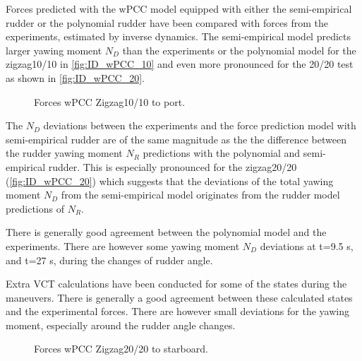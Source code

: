 Forces predicted with the wPCC model equipped with either the semi-empirical rudder or the polynomial rudder have been compared with forces from the experiments, estimated by inverse dynamics. The semi-empirical model predicts larger yawing moment $N_D$ than the experiments or the polynomial model for the zigzag10/10 in \autoref{fig:ID_wPCC_10} and even more pronounced for the 20/20 test as shown in \autoref{fig:ID_wPCC_20}.  
\begin{figure}[h]
     \centering
     
     \caption{Forces wPCC Zigzag10/10 to port.}
     \label{fig:ID_wPCC_10}
\end{figure}
The $N_D$ deviations between the experiments and the force prediction model with semi-empirical rudder are of the same magnitude as the the difference between the rudder yawing moment $N_R$ predictions with the polynomial and semi-empirical rudder. This is especially pronounced for the zigzag20/20 (\autoref{fig:ID_wPCC_20}) which suggests that the deviations of the total yawing moment $N_D$ from the semi-empirical model originates from the rudder model predictions of $N_R$.

There is generally good agreement between the polynomial model and the experiments. There are however some yawing moment $N_D$ deviations at t=9.5 s, and t=27 s, during the changes of rudder angle. 

Extra VCT calculations have been conducted for some of the states during the maneuvers. There is generally a good agreement between these calculated states and the experimental forces. There are however small deviations for the yawing moment, especially around the rudder angle changes. 
\begin{figure}[h]
    
    \caption{Forces wPCC Zigzag20/20 to starboard.}
    \label{fig:ID_wPCC_20}
\end{figure}
%         
%         
